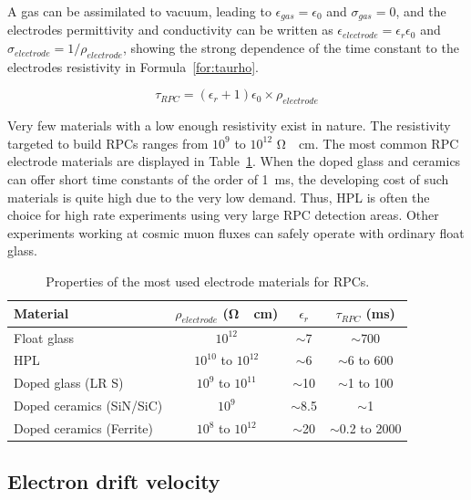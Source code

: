 	A gas can be assimilated to vacuum, leading to $\epsilon_{gas} = \epsilon_0$ and $\sigma_{gas} = 0$, and the electrodes permittivity and conductivity can be written as $\epsilon_{electrode} = \epsilon_r\epsilon_0$ and $\sigma_{electrode} = 1/\rho_{electrode}$, showing the strong dependence of the time constant to the electrodes resistivity in Formula~\ref{for:taurho}.
	
	\begin{equation}
		\label{for:taurho}
		\tau_{RPC} = (\epsilon_r + 1)\epsilon_0\times\rho_{electrode}
	\end{equation}
	
	Very few materials with a low enough resistivity exist in nature. The resistivity targeted to build RPCs ranges from $10^9$ to $10^{12}$ \si{\ohm\cdot cm}. The most common RPC electrode materials are displayed in Table~\ref{tab:tau}. When the doped glass and ceramics can offer short time constants of the order of \SI{1}{ms}, the developing cost of such materials is quite high due to the very low demand. Thus, \acf{HPL} is often the choice for high rate experiments using very large RPC detection areas. Other experiments working at cosmic muon fluxes can safely operate with ordinary float glass.
	
	\begin{table}[!h]
		\centering
		\begin{tabular}{|l|c|c|c|}
		\hline
		Material & $\rho_{electrode}$ (\si{\ohm\cdot cm}) & $\epsilon_r$ & $\tau_{RPC}$ (\si{ms})\\
		\hline
		Float glass & $10^{12}$ & $\sim$7 & $\sim$700\\
		\acl{HPL} & $10^{10}$ to $10^{12}$ & $\sim$6 & $\sim$6 to 600\\
		Doped glass (LR S) & $10^{9}$ to $10^{11}$ & $\sim$10 & $\sim$1 to 100\\
		Doped ceramics (SiN/SiC) & $10^{9}$ & $\sim$8.5 & $\sim$1\\
		Doped ceramics (Ferrite) & $10^{8}$ to $10^{12}$ & $\sim$20 & $\sim$0.2 to 2000\\
		\hline
		\end{tabular}
		\caption{\label{tab:tau} Properties of the most used electrode materials for RPCs.}
	\end{table}
	
	\subsection{Electron drift velocity}
	\label{chapt4:ssec:drift}

